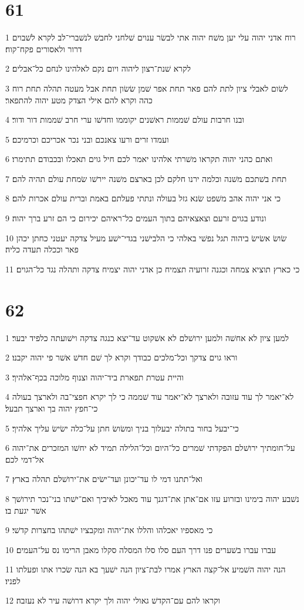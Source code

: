 \chapter{61}

\par 1 רוח אדני יהוה עלי יען משׁח יהוה אתי לבשׂר ענוים שׁלחני לחבשׁ לנשׁברי־לב לקרא לשׁבוים דרור ולאסורים פקח־קוח׃
\par 2 לקרא שׁנת־רצון ליהוה ויום נקם לאלהינו לנחם כל־אבלים׃
\par 3 לשׂום לאבלי ציון לתת להם פאר תחת אפר שׁמן שׂשׂון תחת אבל מעטה תהלה תחת רוח כהה וקרא להם אילי הצדק מטע יהוה להתפאר׃
\par 4 ובנו חרבות עולם שׁממות ראשׁנים יקוממו וחדשׁו ערי חרב שׁממות דור ודור׃
\par 5 ועמדו זרים ורעו צאנכם ובני נכר אכריכם וכרמיכם׃
\par 6 ואתם כהני יהוה תקראו משׁרתי אלהינו יאמר לכם חיל גוים תאכלו ובכבודם תתימרו׃
\par 7 תחת בשׁתכם משׁנה וכלמה ירנו חלקם לכן בארצם משׁנה יירשׁו שׂמחת עולם תהיה להם׃
\par 8 כי אני יהוה אהב משׁפט שׂנא גזל בעולה ונתתי פעלתם באמת וברית עולם אכרות להם׃
\par 9 ונודע בגוים זרעם וצאצאיהם בתוך העמים כל־ראיהם יכירום כי הם זרע ברך יהוה׃
\par 10 שׂושׂ אשׂישׂ ביהוה תגל נפשׁי באלהי כי הלבישׁני בגדי־ישׁע מעיל צדקה יעטני כחתן יכהן פאר וככלה תעדה כליה׃
\par 11 כי כארץ תוציא צמחה וכגנה זרועיה תצמיח כן אדני יהוה יצמיח צדקה ותהלה נגד כל־הגוים׃

\chapter{62}

\par 1 למען ציון לא אחשׁה ולמען ירושׁלם לא אשׁקוט עד־יצא כנגה צדקה וישׁועתה כלפיד יבער׃
\par 2 וראו גוים צדקך וכל־מלכים כבודך וקרא לך שׁם חדשׁ אשׁר פי יהוה יקבנו׃
\par 3 והיית עטרת תפארת ביד־יהוה וצנוף מלוכה בכף־אלהיך׃
\par 4 לא־יאמר לך עוד עזובה ולארצך לא־יאמר עוד שׁממה כי לך יקרא חפצי־בה ולארצך בעולה כי־חפץ יהוה בך וארצך תבעל׃
\par 5 כי־יבעל בחור בתולה יבעלוך בניך ומשׂושׂ חתן על־כלה ישׂישׂ עליך אלהיך׃
\par 6 על־חומתיך ירושׁלם הפקדתי שׁמרים כל־היום וכל־הלילה תמיד לא יחשׁו המזכרים את־יהוה אל־דמי לכם׃
\par 7 ואל־תתנו דמי לו עד־יכונן ועד־ישׂים את־ירושׁלם תהלה בארץ׃
\par 8 נשׁבע יהוה בימינו ובזרוע עזו אם־אתן את־דגנך עוד מאכל לאיביך ואם־ישׁתו בני־נכר תירושׁך אשׁר יגעת בו׃
\par 9 כי מאספיו יאכלהו והללו את־יהוה ומקבציו ישׁתהו בחצרות קדשׁי׃
\par 10 עברו עברו בשׁערים פנו דרך העם סלו סלו המסלה סקלו מאבן הרימו נס על־העמים׃
\par 11 הנה יהוה השׁמיע אל־קצה הארץ אמרו לבת־ציון הנה ישׁעך בא הנה שׂכרו אתו ופעלתו לפניו׃
\par 12 וקראו להם עם־הקדשׁ גאולי יהוה ולך יקרא דרושׁה עיר לא נעזבה׃

